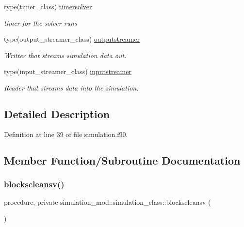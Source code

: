 \begin{DoxyCompactItemize}
type(timer\+\_\+class) \mbox{\hyperlink{structsimulation__mod_1_1simulation__class_a25e03717a6e87410b816ac1f299b282b}{timersolver}}
\begin{DoxyCompactList}\small\item\em timer for the solver runs \end{DoxyCompactList}\item 
type(output\+\_\+streamer\+\_\+class) \mbox{\hyperlink{structsimulation__mod_1_1simulation__class_a75e838871eedd2fd66dc7d9bfce015ad}{outputstreamer}}
\begin{DoxyCompactList}\small\item\em Writter that streams simulation data out. \end{DoxyCompactList}\item 
type(input\+\_\+streamer\+\_\+class) \mbox{\hyperlink{structsimulation__mod_1_1simulation__class_a40add8001e631510e3530931b9a9d06a}{inputstreamer}}
\begin{DoxyCompactList}\small\item\em Reader that streams data into the simulation. \end{DoxyCompactList}\end{DoxyCompactItemize}


\subsection{Detailed Description}


Definition at line 39 of file simulation.\+f90.



\subsection{Member Function/\+Subroutine Documentation}
\mbox{\label{structsimulation__mod_1_1simulation__class_a468cbc4545886a696123087bfaf42de4}} 
\subsubsection{\texorpdfstring{blockscleansv()}{blockscleansv()}}
{\footnotesize\ttfamily procedure, private simulation\+\_\+mod\+::simulation\+\_\+class\+::blockscleansv (\begin{DoxyParamCaption}{ }\end{DoxyParamCaption})\hspace{0.3cm}{\ttfamily [private]}}



